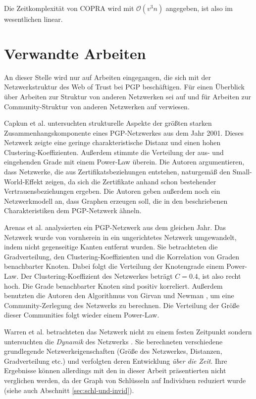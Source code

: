 Die Zeitkomplexität von COPRA wird mit $\mathcal{O}(v^3n)$
angegeben, ist also im wesentlichen linear.

\section{Verwandte Arbeiten}
\label{ch:Grundlagen:sec:RelatedWork}

An dieser Stelle wird nur auf Arbeiten eingegangen, die sich mit der
Netzwerkstruktur des Web of Trust bei PGP beschäftigen. Für einen
Überblick über Arbeiten zur Struktur von anderen Netzwerken sei auf
\cite{newman:167}und für Arbeiten zur Community-Struktur von anderen
Netzwerken auf \cite{Fortunato2010} verwiesen.

Capkun et al. \cite{Capkun2002} untersuchten strukturelle Aspekte der
größten starken Zusammenhangskomponente eines PGP-Netzwerkes aus dem
Jahr 2001. Dieses Netzwerk zeigte eine geringe charakteristische
Distanz und einen hohen Clustering-Koeffizienten. Außerdem stimmte die
Verteilung der aus- und eingehenden Grade mit einem Power-Law
überein. Die Autoren argumentieren, dass Netzwerke, die aus
Zertifikatsbeziehungen entstehen, naturgemäß den Small-World-Effekt
zeigen, da sich die Zertifikate anhand schon bestehender
Vertrauensbeziehungen ergeben. Die Autoren geben außerdem noch ein
Netzwerkmodell an, dass Graphen erzeugen soll, die in den
beschriebenen Charakteristiken dem PGP-Netzwerk ähneln.

Arenas et al. \cite{Boguna2004} analysierten ein PGP-Netzwerk aus dem
gleichen Jahr. Das Netzwerk wurde von vornherein in ein ungerichtetes
Netzwerk umgewandelt, indem nicht gegenseitige Kanten entfernt
wurden. Sie betrachteten die Gradverteilung, den
Clustering-Koeffizienten und die Korrelation von Graden benachbarter
Knoten. Dabei folgt die Verteilung der Knotengrade einem
Power-Law. Der Clustering-Koeffizient des Netzwerkes beträgt $C=0.4$,
ist also recht hoch. Die Grade benachbarter Knoten sind positiv
korreliert. Außerdem benutzten die Autoren den Algorithmus von Girvan
und Newman \cite{Newman2004}, um eine Community-Zerlegung des Netzwerks
zu berechnen. Die Verteilung der Größe dieser Communities folgt wieder
einem Power-Law.

Warren et al. betrachteten das Netzwerk nicht zu einem festen
Zeitpunkt sondern untersuchten die \emph{Dynamik} des
Netzwerks \cite{Warren2007}. Sie berechneten verschiedene grundlegende
Netzwerkeigenschaften (Größe des Netzwerkes, Distanzen,
Gradverteilung etc.) und verfolgten deren Entwicklung \emph{über die
  Zeit}. Ihre Ergebnisse können allerdings mit den in dieser Arbeit
präsentierten nicht verglichen werden, da der Graph von Schlüsseln
auf Individuen reduziert wurde (siehe auch Abschnitt
\ref{sec:schl-und-invid}).

